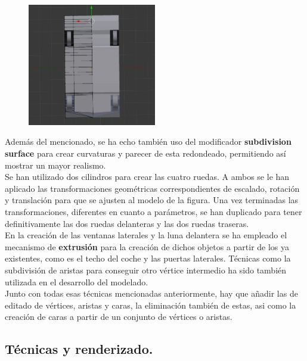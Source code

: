 \documentclass[10pt]{article}
\begin{document}
\begin{figure}[H]
	\begin{center}
 		\includegraphics[width = 0.5\textwidth]{Imagenes/mirror3.eps}
	\end{center} 
\end{figure}

Además del mencionado, se ha echo también uso del modificador  \textbf{subdivision surface} para crear curvaturas y parecer de esta redondeado, permitiendo así mostrar un mayor realismo.\\

Se han utilizado dos cilindros para crear las cuatro ruedas. A ambos se le han aplicado las transformaciones geométricas correspondientes de escalado, rotación y translación para que se ajusten al modelo de la figura. Una vez terminadas las transformaciones, diferentes en cuanto a parámetros, se han duplicado para tener definitivamente las dos ruedas delanteras y las dos ruedas traseras. \\

En la creación de las ventanas laterales y la luna delantera se ha empleado el mecanismo de  \textbf{extrusión} para la creación de dichos objetos a partir de los ya existentes, como es el techo del coche y las puertas laterales. Técnicas como la subdivisión de aristas para conseguir otro vértice intermedio ha sido también utilizada en el desarrollo del modelado.\\

Junto con todas esas técnicas mencionadas anteriormente, hay que añadir las de editado de vértices, aristas y caras, la eliminación también de estas, asi como la creación de caras a partir de un conjunto de vértices o aristas.\\


\subsection{Técnicas y renderizado.}
\end{document}
